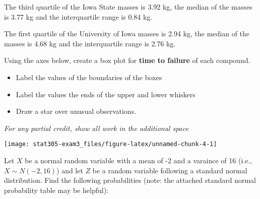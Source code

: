 \documentclass[fleqn,answers,addpoints]{exam}
\newcommand{\qparts}[1]{\begin{parts} #1 \end{parts}}
\begin{document}
\begin{questions}
The third quartile of the Iowa State masses is 3.92 kg, the median of
the masses is 3.77 kg and the interquartile range is 0.84 kg.

The first quartile of the University of Iowa masses is 2.94 kg, the
median of the masses is 4.68 kg and the interquartile range is 2.76 kg.

\vspace{0.5cm}

Using the axes below, create a box plot for \textbf{time to failure} of
each compound.

\begin{itemize}
   \item Label the values of the boundaries of the boxes
   \item Label the values the ends of the upper and lower whiskers
   \item Draw a star over unusual observations.
\end{itemize}

\textit{For any partial credit, show all work in the additional space}
\vspace{1cm}

\texttt{[image: stat305-exam3\_files/figure-latex/unnamed-chunk-4-1]}

\newpage

\question

Let \(X\) be a normal random variable with a mean of -2 and a varaince
of 16 (i.e., \(X \sim N(-2, 16)\)) and let \(Z\) be a random variable
following a standard normal distribution. Find the following
probabilities (note: the attached standard normal probability table may
be helpful):

\qparts{
\part[2] $P(Z \le 1.0)$ \vspace{3cm}
\part[2] $P(|Z| \le 2.5)$ \vspace{3cm}
\part[2] $P(-8 \le X < 1)$ \vspace{4cm}
\part[3] $P(|X| \ge 4)$ \vspace{4cm}
}


\end{questions}
\end{document}
